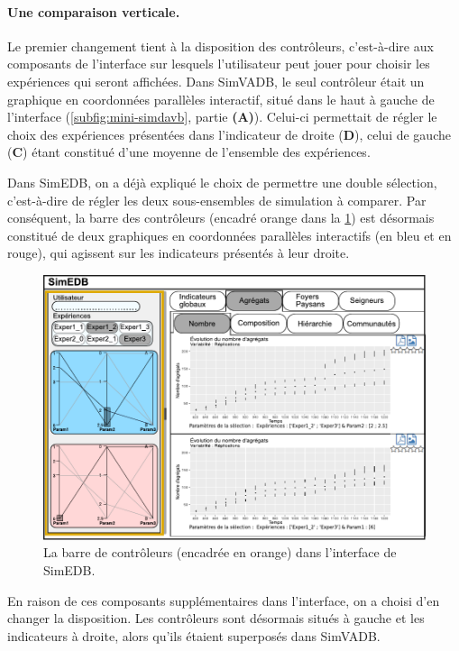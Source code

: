 \paragraph{Une comparaison verticale.}

Le premier changement tient à la disposition des \og contrôleurs\fg{}, c'est-à-dire aux composants de l'interface sur lesquels l'utilisateur peut jouer pour choisir les expériences qui seront affichées.
Dans SimVADB, le seul contrôleur était un graphique en coordonnées parallèles interactif, situé dans le haut à gauche de l'interface (\cref{subfig:mini-simdavb}, partie \textbf{(A)}).
Celui-ci permettait de régler le choix des expériences présentées dans l'indicateur de droite (\textbf{D}), celui de gauche (\textbf{C}) étant constitué d'une moyenne de l'ensemble des expériences.

Dans SimEDB, on a déjà expliqué le choix de permettre une double sélection, c'est-à-dire de régler les deux sous-ensembles de simulation à comparer.
Par conséquent, la barre des contrôleurs (encadré orange dans la \cref{fig:simedb-sidebar}) est désormais constitué de deux graphiques en coordonnées parallèles interactifs (en bleu et en rouge), qui agissent sur les indicateurs présentés à leur droite.

\begin{figure}[H]
	\centering
	\includegraphics[width=\linewidth]{img/mockup_SimEDB_controleurs.pdf}
	\caption[La barre de contrôleurs dans l'interface de SimEDB.]{La barre de contrôleurs (encadrée en orange) dans l'interface de SimEDB.}
	\label{fig:simedb-sidebar}
\end{figure}

En raison de ces composants supplémentaires dans l'interface, on a choisi d'en changer la disposition. Les contrôleurs sont désormais situés à gauche et les indicateurs à droite, alors qu'ils étaient superposés dans SimVADB.

